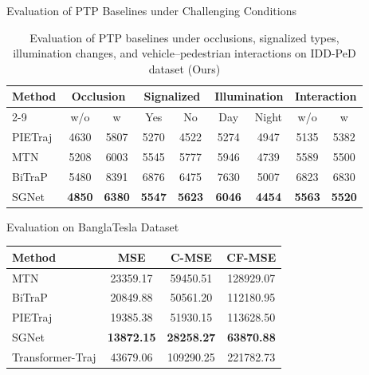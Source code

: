 \documentclass[
	11pt, %
]{beamer}
\begin{document}
\begin{frame}{Evaluation of PTP Baselines under Challenging Conditions}
\begin{table}[ht]
\centering
\scriptsize
\begin{tabular}{lcccccccc}
\hline
\textbf{Method}
& \multicolumn{2}{c}{\textbf{Occlusion}}
& \multicolumn{2}{c}{\textbf{Signalized}}
& \multicolumn{2}{c}{\textbf{Illumination}}
& \multicolumn{2}{c}{\textbf{Interaction}} \\
\cline{2-9}

& w/o & w
& Yes & No
& Day & Night
& w/o & w \\
\hline
PIETraj
& 4630 & 5807
& 5270 & 4522
& 5274 & 4947
& 5135 & 5382 \\

MTN
& 5208 & 6003
& 5545 & 5777
& 5946 & 4739
& 5589 & 5500 \\

BiTraP
& 5480 & 8391
& 6876 & 6475
& 7630 & 5007
& 6823 & 6830 \\

SGNet
& \textbf{4850} & \textbf{6380}
& \textbf{5547} & \textbf{5623}
& \textbf{6046} & \textbf{4454}
& \textbf{5563} & \textbf{5520} \\
\hline
\end{tabular}
\caption{Evaluation of PTP baselines under occlusions, signalized types, illumination changes, and vehicle--pedestrian interactions on IDD-PeD dataset (Ours)}
\end{table}
\end{frame}



\begin{frame}{Evaluation on BanglaTesla Dataset}
\begin{table}[ht]
\centering
\begin{tabular}{lccc}
\hline
\textbf{Method} & \textbf{MSE} & \textbf{C-MSE} & \textbf{CF-MSE} \\
\hline
MTN                & 23359.17 & 59450.51  & 128929.07 \\
BiTraP             & 20849.88 & 50561.20  & 112180.95 \\
PIETraj            & 19385.38 & 51930.15  & 113628.50 \\
SGNet              & \textbf{13872.15} & \textbf{28258.27} & \textbf{63870.88} \\
Transformer-Traj   & 43679.06 & 109290.25 & 221782.73 \\
\hline
\end{tabular}
\end{table}
\caption{Evaluation of PTP baselines on BanglaTesla dataset (our dataset)}
\end{frame}
\end{document}
